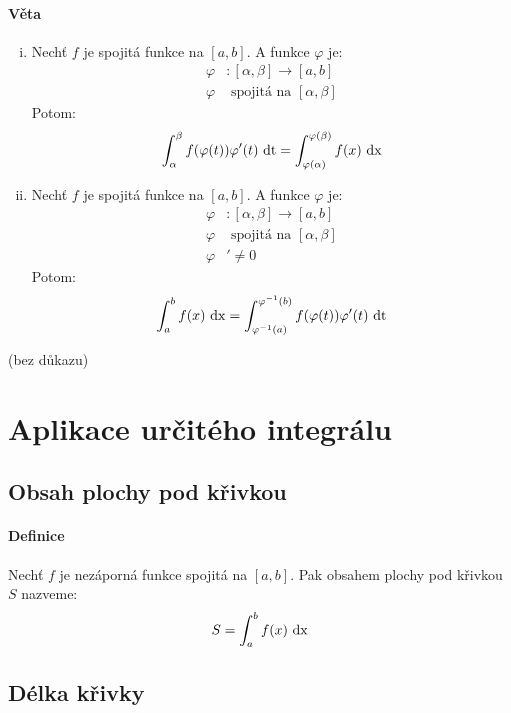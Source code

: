 \documentclass[a4paper,10pt]{article}
\begin{document}
\paragraph{Věta}
\begin{enumerate}[i.]
	\item  Nechť $f$ je spojitá funkce na $[a,b]$. A funkce $\varphi$ je:
	\begin{align*}
		\varphi&: [\alpha,\beta] \to [a,b] \\
		\varphi& \text{ spojitá na } [\alpha, \beta]
	\end{align*}
	Potom:
	\begin{align*}
		\int_\alpha^\beta f(\varphi(t)) \varphi'(t) \operatorname*{\,dt} =
		\int_{\varphi(\alpha)}^{\varphi(\beta)} f(x) \operatorname*{\,dx}
	\end{align*}
	
	\item  Nechť $f$ je spojitá funkce na $[a,b]$. A funkce $\varphi$ je:
	\begin{align*}
		\varphi&: [\alpha,\beta] \to [a,b] \\
		\varphi& \text{ spojitá na } [\alpha, \beta]\\
		\varphi&' \neq 0 
	\end{align*}
	Potom:
	\begin{align*}
		\int_a^b f(x) \operatorname*{\,dx} = \int_{\varphi^{-1}(a)}^{\varphi^{-1}(b)}
		f(\varphi(t)) \varphi'(t) \operatorname*{\,dt}
	\end{align*}
\end{enumerate}
(bez důkazu)


\section{Aplikace určitého integrálu}
\subsection{Obsah plochy pod křivkou}
\paragraph{Definice}
Nechť $f$ je nezáporná funkce spojitá na $[a,b]$. Pak obsahem plochy pod křivkou $S$ nazveme:
\setcounter{equation}{0}
\begin{align*}
	S = \int_a^b f(x) \operatorname*{\,dx}
\end{align*}

\subsection{Délka křivky}
\end{document}
